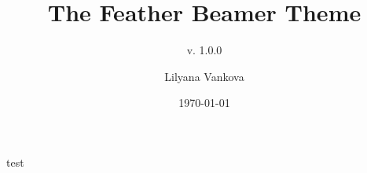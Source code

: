 \documentclass{beamer}
\title{The Feather Beamer Theme}
\subtitle{v. 1.0.0}
\author{Lilyana Vankova}
\institute{Faculty of Mathematics, Informatics and Information}
\date{\today}
\begin{document}
\begin{frame}
test
\end{frame}
\end{document}
